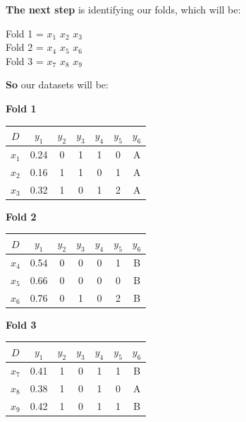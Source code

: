 \documentclass[12pt]{article}
\begin{document}
\begin{enumerate}[leftmargin=\labelsep]
\begin{enumerate}
          \textbf{The next step} is identifying our folds, which will be:
          \begin{center}
            Fold 1 = $x_1$ $x_2$ $x_3$  \\
            Fold 2 = $x_4$ $x_5$ $x_6$ \\
            Fold 3 = $x_7$ $x_8$ $x_9$ \\
          \end{center}

          \textbf{So} our datasets will be:

          \begin{center}
            \textbf{Fold 1} \\
            \begin{tabular}{c|cccccc}
                \(D\) & \(y_1\) & \(y_2\) & \(y_3\) & \(y_4\) & \(y_5\) & \(y_6\)\\
                \hline
                \(x_1\) & 0.24 & 0 & 1 & 1 & 0 & A  \\
                \(x_2\) & 0.16 & 1 & 1 & 0 & 1 & A  \\
                \(x_3\) & 0.32 & 1 & 0 & 1 & 2 & A  \\
            \end{tabular}
          \end{center}

          \begin{center}
            \textbf{Fold 2} \\
            \begin{tabular}{c|cccccc}
                \(D\) & \(y_1\) & \(y_2\) & \(y_3\) & \(y_4\) & \(y_5\) & \(y_6\)\\
                \hline
                \(x_4\) & 0.54 & 0 & 0 & 0 & 1 & B  \\
                \(x_5\) & 0.66 & 0 & 0 & 0 & 0 & B  \\
                \(x_6\) & 0.76 & 0 & 1 & 0 & 2 & B  \\
            \end{tabular}
          \end{center}

          \begin{center}
            \textbf{Fold 3} \\
            \begin{tabular}{c|cccccc}
                \(D\) & \(y_1\) & \(y_2\) & \(y_3\) & \(y_4\) & \(y_5\) & \(y_6\)\\
                \hline
                \(x_7\) & 0.41 & 1 & 0 & 1 & 1 & B  \\
                \(x_8\) & 0.38 & 1 & 0 & 1 & 0 & A  \\
                \(x_9\) & 0.42 & 1 & 0 & 1 & 1 & B  \\
            \end{tabular}
          \end{center}


\end{enumerate}
\end{enumerate}
\end{document}

